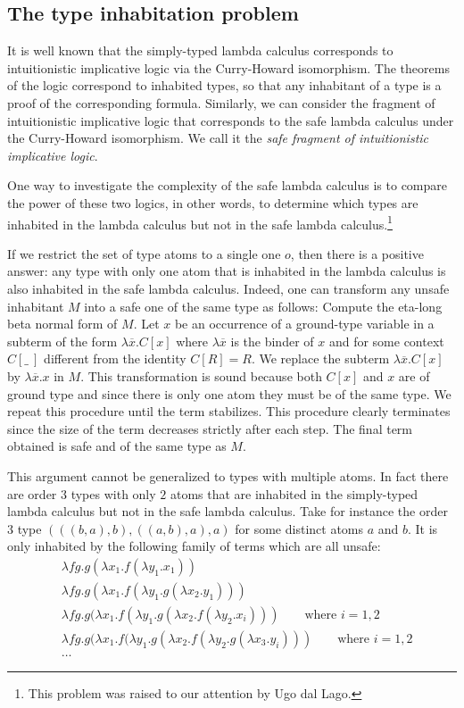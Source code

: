 \subsection*{The type inhabitation problem}

It is well known that the simply-typed lambda calculus corresponds
to intuitionistic implicative logic via the Curry-Howard
isomorphism. The theorems of the logic correspond to inhabited
types, so that any inhabitant of a type is a proof of the
corresponding formula. Similarly, we can consider the fragment of
intuitionistic implicative logic that corresponds to the safe lambda
calculus under the Curry-Howard isomorphism. We call it the
\emph{safe fragment of intuitionistic implicative logic}.

One way to investigate the complexity of the safe lambda calculus is
to compare the power of these two logics, in other words, to
determine which types are inhabited in the lambda calculus but not
in the safe lambda calculus.\footnote{This problem was raised to our
attention by Ugo dal Lago.}

If we restrict the set of type atoms to a single one $o$, then there
is a positive answer: any type with only one atom that is inhabited
in the lambda calculus is also inhabited in the safe lambda
calculus. Indeed, one can transform any unsafe inhabitant $M$ into a
safe one of the same type as follows: Compute the eta-long beta
normal form of $M$. Let $x$ be an occurrence of a ground-type
variable in a subterm of the form $\lambda \overline{x} . C[x]$
where $\lambda \overline{x}$ is the binder of $x$ and for some
context $C[\_~]$ different from the identity $C[R]=R$. We replace
the subterm $\lambda \overline{x} . C[x]$ by $\lambda \overline{x}.
x$ in $M$. This transformation is sound because both $C[x]$ and $x$
are of ground type and since there is only one atom they must
be of the same type. We repeat this procedure until the term
stabilizes. This procedure clearly terminates since the size of the
term decreases strictly after each step. The final term obtained is
safe and of the same type as $M$.

This argument cannot be generalized to types with multiple atoms. In fact there are order $3$ types with only $2$ atoms that are inhabited in the simply-typed lambda calculus but not in the safe lambda calculus. Take for instance the order $3$ type
 $( ((b, a), b),  ((a, b), a),  a)$ for some distinct atoms $a$ and $b$. It is only inhabited by the following family of terms which are all unsafe:
 \begin{align*}
& \lambda f g . g (\lambda x_1 . f (\lambda y_1 . x_1)) \\
&\lambda f g . g (\lambda x_1 . f (\lambda y_1 . g (\lambda x_2 . y_1))) \\
&\lambda f g . g (\lambda x_1 . f (\lambda y_1 . g (\lambda x_2 . f (\lambda y_2 . x_i))) \qquad\mbox{where $i = 1, 2$} \\
&\lambda f g . g (\lambda x_1 . f (\lambda y_1 . g (\lambda x_2 . f (\lambda y_2 . g (\lambda x_3 . y_i))) \qquad\mbox{where $i = 1, 2$} \\
&\ldots
\end{align*}

